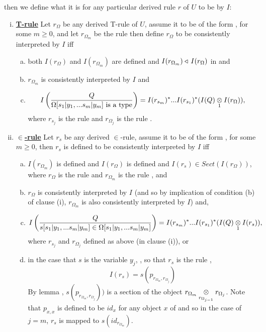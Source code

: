 \begin{numbereddefinition}
\IfIpartialmappingUtoCw
then we define what it is for any particular derived rule $r$ of $U$ to be  by $I$: \\
\begin{enumerate}[(i)]
\item \underline{\textbf{T-rule}} 
Let $r_\Omega$ be any  derived T-rule of $U$, assume it to be of the form \ZOmega, for some $m \geq 0$, 
and let $r_{\Omega_m}$ be the rule 
then define $r_\Omega$ to be consistently interpreted by $I$ iff
\begin{enumerate}[(a)] 
\item both $I(r_\Omega)$ and $I(r_{\Omega_m})$ are defined and $I(r_{\Omega_m}) \base\, I(r_\Omega)$ in \catcw and 
\item $r_{\Omega_m}$ is consistently interpreted by $I$  and
\item
\smMappedToCacscade
$$ \Imappedrule{Q}{\isT{\Omega[\SUBsFORy{m}]}} 
= I(r_{s_m})^*...I(r_{s_1})^*(\crossx{I(Q)}{I(r_\Omega)}{1}),$$
where $r_{s_j}$ is the rule  
and $r_{\Omega_j}$ is the rule .
\end {enumerate}
\item \underline{\textbf{$\in$-rule}} 
Let $r_s$ be any derived $\in$-rule, assume it to be of the form \ZsOmega, for some $m \geq 0$, then
$r_s$ is defined to be consistently interpreted by $I$ 
iff  
\begin{enumerate}[(a)]
\item $I(r_{\Omega_m})$ is defined and $I(r_\Omega)$ is defined and $\displaystyle I(r_s) \in Sect(I(r_\Omega))$, where
$r_\Omega$ is the rule \ZOmega and $r_{\Omega_m}$ is the rule , and
\item
$r_{\Omega}$ is consistently interpreted by $I$ (and so by implication of condition (b) of clause (i),  $r_{\Omega_m}$ is also consistently interpreted by $I$) and,
\item  
\smMappedToCacscade
$$ \Imappedrule{Q}{\ofT{s[\SUBsFORy{m}]}{\Omega[\SUBsFORy{m}]}} = I(r_{s_m})^*...I(r_{s_1})^*(\crossx{I(Q)}{I(r_s)}{1}),$$
where $r_{s_j}$ and $r_{\Omega_j}$ defined as above (in clause (i)), or
\item in the case that $s$ is the variable $y_j$, \forsomej, so that $r_s$ is the rule ,
$$I(r_s) = s(p_{r_{\Omega_m},r_{\Omega_j}})$$
By lemma , $s(p_{r_{\Omega_m},r_{\Omega_j}}))$ is a section of the object $\crossx{r_{\Omega_m}}{r_{\Omega_j}}{r_{\Omega_{j-1}}}$.
Note that $p_{x,x}$ is defined to be $id_{x}$ for any object $x$ of \catcw and so in the case of $j=m$, $r_s$
is mapped to   $s(id_{r_{\Omega_m}})$.
\end{enumerate}


\end{enumerate}
\end{numbereddefinition}
